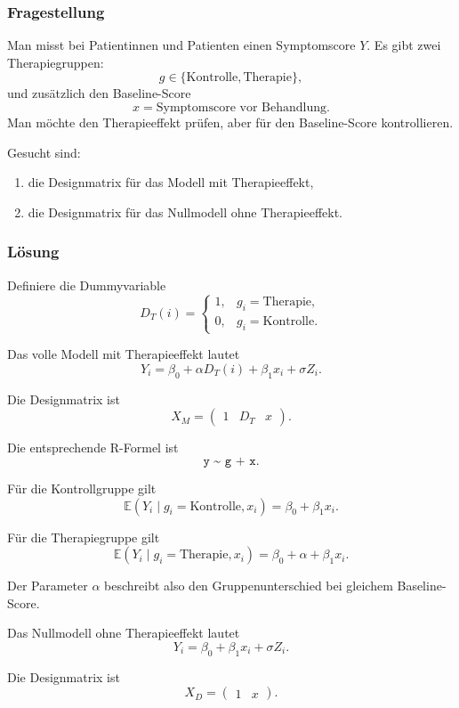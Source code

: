 \documentclass[10pt, letterpaper]{article}
\begin{document}
\subsubsection*{Fragestellung}

Man misst bei Patientinnen und Patienten einen Symptomscore \(Y\). Es gibt zwei Therapiegruppen:
\[
g\in\{\text{Kontrolle},\text{Therapie}\},
\]
und zusätzlich den Baseline-Score
\[
x=\text{Symptomscore vor Behandlung}.
\]
Man möchte den Therapieeffekt prüfen, aber für den Baseline-Score kontrollieren.

Gesucht sind:
\begin{enumerate}
    \item die Designmatrix für das Modell mit Therapieeffekt,
    \item die Designmatrix für das Nullmodell ohne Therapieeffekt.
\end{enumerate}

\subsubsection*{Lösung}

Definiere die Dummyvariable
\[
D_T(i)=
\begin{cases}
1, & g_i=\text{Therapie},\\
0, & g_i=\text{Kontrolle}.
\end{cases}
\]

Das volle Modell mit Therapieeffekt lautet
\[
Y_i=\beta_0+\alpha D_T(i)+\beta_1x_i+\sigma Z_i.
\]

Die Designmatrix ist
\[
X_M=
\begin{pmatrix}
1 & D_T & x
\end{pmatrix}.
\]

Die entsprechende R-Formel ist
\[
\texttt{y \textasciitilde{} g + x}.
\]

Für die Kontrollgruppe gilt
\[
\mathbb E(Y_i\mid g_i=\text{Kontrolle},x_i)
=
\beta_0+\beta_1x_i.
\]

Für die Therapiegruppe gilt
\[
\mathbb E(Y_i\mid g_i=\text{Therapie},x_i)
=
\beta_0+\alpha+\beta_1x_i.
\]

Der Parameter \(\alpha\) beschreibt also den Gruppenunterschied bei gleichem Baseline-Score.

Das Nullmodell ohne Therapieeffekt lautet
\[
Y_i=\beta_0+\beta_1x_i+\sigma Z_i.
\]

Die Designmatrix ist
\[
X_D=
\begin{pmatrix}
1 & x
\end{pmatrix}.
\]
\end{document}
